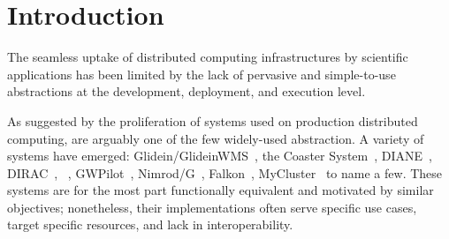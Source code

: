 \documentclass{sig-alternate}
\begin{document}
\begin{abstract}
%
\end{abstract}



%
\section{Introduction}
\label{sec:intro}


The seamless uptake of distributed computing infrastructures by scientific
applications has been limited by the lack of pervasive and simple-to-use
abstractions at the development, deployment, and execution level.

As suggested by the proliferation of \pilotjob systems used on production
distributed computing, \pilotjobs are arguably one of the few widely-used
abstraction.  A variety of \pilotjob systems have emerged:
Glidein/GlideinWMS~\cite{frey2002condorG}, the Coaster
System~\cite{wilde2011swift}, DIANE~\cite{moscicki2003diane},
DIRAC~\cite{casajus2010dirac}, \panda~\cite{chiu2010pilot},
GWPilot~\cite{rubio2015gwpilot}, Nimrod/G~\cite{buyya2000nimrod},
Falkon~\cite{raicu2007falkon}, MyCluster~\cite{walker2006creating} to name a
few. These systems are for the most part functionally equivalent and motivated
by similar objectives; nonetheless, their implementations often serve specific
use cases, target specific resources, and lack in interoperability.
\end{document}
